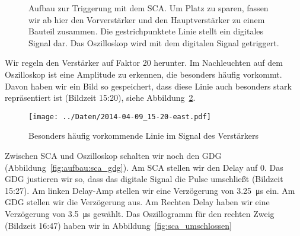 \begin{figure}[htbp]
    \centering
    \caption{%
        Aufbau zur Triggerung mit dem SCA. Um Platz zu sparen, fassen wir ab
        hier den Vorverstärker und den Hauptverstärker zu einem Bauteil
        zusammen. Die gestrichpunktete Linie stellt ein digitales Signal dar.
        Das Oszilloskop wird mit dem digitalen Signal getriggert.
    }
    \label{fig:aufbau:sca_trigger}
\end{figure}

Wir regeln den Verstärker auf Faktor 20 herunter. Im Nachleuchten auf dem
Oszilloskop ist eine Amplitude zu erkennen, die besonders häufig vorkommt. Davon
haben wir ein Bild so gespeichert, dass diese Linie auch besonders stark
repräsentiert ist (Bildzeit 15:20), siehe Abbildung~\ref{fig:511}.

\begin{figure}[htbp]
    \centering
    \texttt{[image: ../Daten/2014-04-09\_15-20-east.pdf]}
    \caption{%
        Besonders häufig vorkommende Linie im Signal des Verstärkers
    }
    \label{fig:511}
\end{figure}

Zwischen SCA und Oszilloskop schalten wir noch den GDG
(Abbildung~\ref{fig:aufbau:sca_gdg}). Am SCA stellen wir den Delay auf 0. Das
GDG justieren wir so, dass das digitale Signal die Pulse umschließt (Bildzeit
15:27). Am linken Delay-Amp stellen wir eine Verzögerung von
\SI{3.25}{\micro\second} ein. Am GDG stellen wir die Verzögerung aus. Am
Rechten Delay haben wir eine Verzögerung von \SI{3.5}{\micro\second} gewählt.
Das Oszillogramm für den rechten Zweig (Bildzeit 16:47) haben wir in
Abbildung~\ref{fig:sca_umschlossen}

